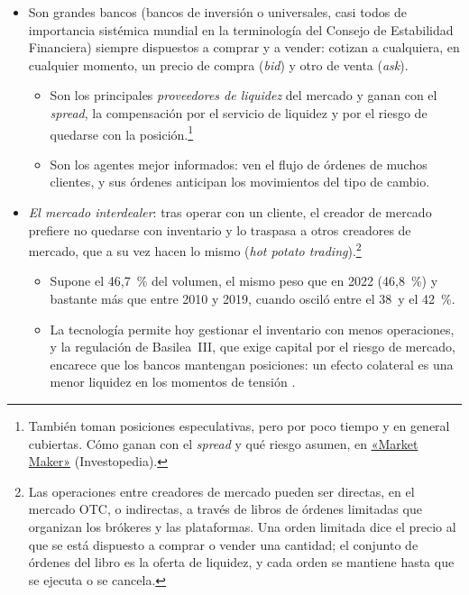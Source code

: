 \documentclass[11pt]{article}
\begin{document}
\begin{itemize}
\item Son grandes bancos (bancos de inversión o universales, casi todos de importancia sistémica mundial en la terminología del Consejo de Estabilidad Financiera) siempre dispuestos a comprar y a vender: cotizan a cualquiera, en cualquier momento, un precio de compra (\emph{bid}) y otro de venta (\emph{ask}).
  \begin{itemize}
  \item Son los principales \emph{proveedores de liquidez} del mercado y ganan con el \emph{spread}, la compensación por el servicio de liquidez y por el riesgo de quedarse con la posición.\footnote{También toman posiciones especulativas, pero por poco tiempo y en general cubiertas. Cómo ganan con el \emph{spread} y qué riesgo asumen, en \href{https://www.investopedia.com/terms/m/marketmaker.asp}{«Market Maker»} (Investopedia).}
  \item Son los agentes mejor informados: ven el flujo de órdenes de muchos clientes, y sus órdenes anticipan los movimientos del tipo de cambio.
  \end{itemize}
\item \emph{El mercado interdealer}: tras operar con un cliente, el creador de mercado prefiere no quedarse con inventario y lo traspasa a otros creadores de mercado, que a su vez hacen lo mismo (\emph{hot potato trading}).\footnote{Las operaciones entre creadores de mercado pueden ser directas, en el mercado OTC, o indirectas, a través de libros de órdenes limitadas que organizan los brókeres y las plataformas. Una orden limitada dice el precio al que se está dispuesto a comprar o vender una cantidad; el conjunto de órdenes del libro es la oferta de liquidez, y cada orden se mantiene hasta que se ejecuta o se cancela.}
  \begin{itemize}
  \item Supone el 46,7~\% del volumen, el mismo peso que en 2022 (46,8~\%) y bastante más que entre 2010 y 2019, cuando osciló entre el 38~y el 42~\%\nocite{BIS2026TrienalDatos}.
  \item La tecnología permite hoy gestionar el inventario con menos operaciones, y la regulación de Basilea~III, que exige capital por el riesgo de mercado, encarece que los bancos mantengan posiciones: un efecto colateral es una menor liquidez en los momentos de tensión .
  \end{itemize}
\end{itemize}
\end{document}
